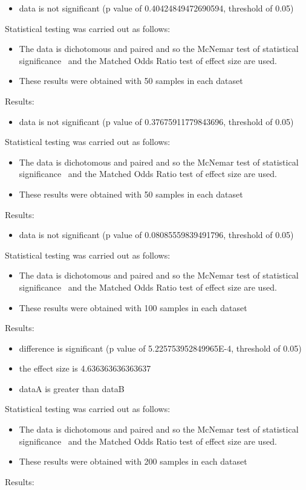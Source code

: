 \documentclass[]{article}
\begin{document}
\begin{itemize}
\item{data is not significant (p value of 0.40424849472690594, threshold of 0.05)}
\end{itemize}Statistical testing was carried out as follows: \begin{itemize}
\item{The data is dichotomous and paired and so the McNemar test of statistical significance~\cite{Gibbons2011} and the Matched Odds Ratio test of effect size are used.}
\item{These results were obtained with 50 samples in each dataset}
\end{itemize}Results:
\begin{itemize}
\item{data is not significant (p value of 0.37675911779843696, threshold of 0.05)}
\end{itemize}Statistical testing was carried out as follows: \begin{itemize}
\item{The data is dichotomous and paired and so the McNemar test of statistical significance~\cite{Gibbons2011} and the Matched Odds Ratio test of effect size are used.}
\item{These results were obtained with 50 samples in each dataset}
\end{itemize}Results:
\begin{itemize}
\item{data is not significant (p value of 0.08085559839491796, threshold of 0.05)}
\end{itemize}Statistical testing was carried out as follows: \begin{itemize}
\item{The data is dichotomous and paired and so the McNemar test of statistical significance~\cite{Gibbons2011} and the Matched Odds Ratio test of effect size are used.}
\item{These results were obtained with 100 samples in each dataset}
\end{itemize}Results:
\begin{itemize}
\item{difference is significant (p value of 5.225753952849965E-4, threshold of 0.05)}
\item{the effect size is 4.636363636363637}
\item{dataA is greater than dataB}
\end{itemize}Statistical testing was carried out as follows: \begin{itemize}
\item{The data is dichotomous and paired and so the McNemar test of statistical significance~\cite{Gibbons2011} and the Matched Odds Ratio test of effect size are used.}
\item{These results were obtained with 200 samples in each dataset}
\end{itemize}Results:
\end{document}
